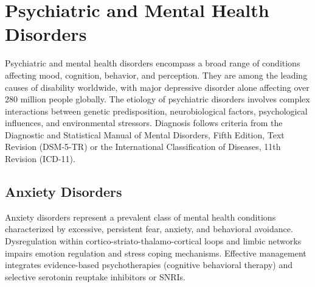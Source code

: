 \chapter{Psychiatric and Mental Health Disorders}
\label{ch:psychiatric}
Psychiatric and mental health disorders encompass a broad range of conditions affecting mood, cognition, behavior, and perception. They are among the leading causes of disability worldwide, with major depressive disorder alone affecting over 280 million people globally. The etiology of psychiatric disorders involves complex interactions between genetic predisposition, neurobiological factors, psychological influences, and environmental stressors. Diagnosis follows criteria from the Diagnostic and Statistical Manual of Mental Disorders, Fifth Edition, Text Revision (DSM-5-TR) or the International Classification of Diseases, 11th Revision (ICD-11).

\section{Anxiety Disorders}




Anxiety disorders represent a prevalent class of mental health conditions characterized by excessive, persistent fear, anxiety, and behavioral avoidance. Dysregulation within cortico-striato-thalamo-cortical loops and limbic networks impairs emotion regulation and stress coping mechanisms. Effective management integrates evidence-based psychotherapies (cognitive behavioral therapy) and selective serotonin reuptake inhibitors or SNRIs.





\label{sec:Anxiety Disorders}

